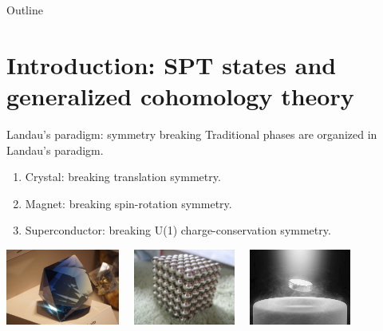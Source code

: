 \documentclass[xcolor=table, aspectratio=169,ignorenonframetext]{beamer}
\begin{document}
\begin{frame}{Outline}
		\tableofcontents
\end{frame}

\section{Introduction: SPT states and generalized cohomology theory}

\begin{frame}{Landau's paradigm: symmetry breaking}
  Traditional phases are organized in Landau's paradigm.
  \begin{enumerate}
  \item Crystal: breaking translation symmetry.
  \item Magnet: breaking spin-rotation symmetry.
  \item Superconductor: breaking U(1) charge-conservation symmetry.
  \end{enumerate}
  \begin{center}
    \includegraphics[height=2.5cm]{../resources/crystal}~~
    \includegraphics[height=2.5cm]{../resources/magnet}~~
    \includegraphics[height=2.5cm]{../resources/sc}
  \end{center}
\end{frame}
\end{document}
